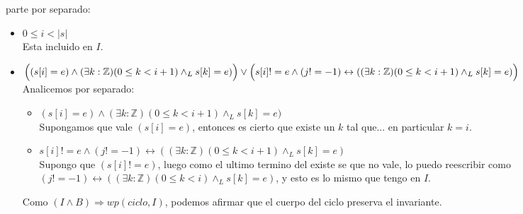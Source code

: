 \documentclass[a4paper]{article}
\begin{document}
	parte por separado:
	\begin{itemize}
		\item $ 0\leq i<|s|$\smallskip \\
		Esta incluido en $I$.
		\item $\Big((s[i]=e)\wedge (\exists k:\mathbb{Z})(0\leq k<i+1)\wedge_L s[k]=e)\Big) \vee\\
   	\Big( s[i]!=e\wedge (j!=-1)\leftrightarrow ((\exists k:\mathbb{Z})(0\leq k<i+1)\wedge_L s[k]=e)\Big)$\smallskip \\
		Analicemos por separado:
		\begin{itemize}
		\item $(s[i]=e)\wedge (\exists k:\mathbb{Z})(0\leq k<i+1)\wedge_L s[k]=e)$\\
		Supongamos que vale $(s[i]=e)$, entonces es cierto que existe un $k$ tal que... en 
		particular $k=i$.
		\item  $s[i]!=e\wedge (j!=-1)\leftrightarrow ((\exists k:\mathbb{Z})(0\leq k<i+1)\wedge_L s[k]=e)$\\
		Supongo que $(s[i]!=e)$, luego como el ultimo termino del existe se que no vale, lo puedo reescribir como
			$ (j!=-1)\leftrightarrow ((\exists k:\mathbb{Z})(0\leq k<i)\wedge_L s[k]=e)$, y esto es lo mismo que tengo en $I$.
		\end{itemize}
		Como $(I\wedge B) \Rightarrow wp(ciclo,I)$, podemos afirmar que el cuerpo del ciclo preserva el invariante.
	\end{itemize}
	
\end{document}
